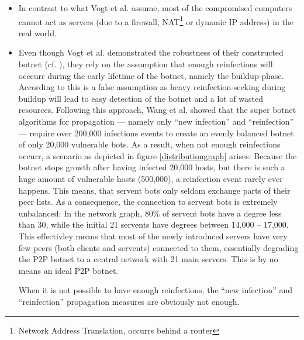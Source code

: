 \documentclass{llncs}
\begin{document}
\begin{itemize}
\item \label{nat} In contrast to what Vogt et al. assume, most of the
  compromised computers cannot act as servers (due to a firewall,
  NAT\footnote{Network Address Translation, occurrs behind a router}
  or dynamic IP address) in the real world.
\item Even though Vogt et al. demonstrated the robustness of their
  constructed botnet (cf. \cite{vogt2007army}), they rely on the
  assumption that enough reinfections will occcurr during the early
  lifetime of the botnet, namely the buildup-phase. According to
  \cite{td1sc} this is a false assumption as heavy reinfection-seeking
  during buildup will lead to easy detection of the botnet and a lot
  of wasted resources. Following this approach, Wang et al. showed
  that the super botnet algorithms for propagation --- namely only
  ``new infection'' and ``reinfection'' --- require over 200,000
  infections events to create an evenly balanced botnet of only 20,000
  vulnerable bots. As a result, when not enough reinfections occurr, a
  scenario as depicted in figure \ref{distributiongraph} arises:
  Because the botnet stops growth after having infected 20,000 hosts,
  but there is such a huge amount of vulnerable hosts (500,000), a
  reinfection event rarely ever happens. This means, that servent bots
  only seldom exchange parts of their peer lists. As a consequence,
  the connection to servent bots is extremely unbalanced: In the
  network graph, 80\% of servent bots have a degree less than 30,
  while the initial 21 servents have degrees between 14,000 --
  17,000. This effectivley means that most of the newly introduced
  servers have very few peers (both clients and servents) connected to
  them, essentially degrading the P2P botnet to a central network with
  21 main servers. This is by no means an ideal P2P botnet.

When it is not possible to have enough reinfections, the ``new
infection'' and ``reinfection'' propagation measures are obviously not
enough.
\end{itemize}
\end{document}
